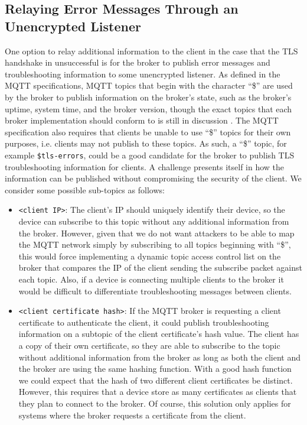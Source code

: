 \documentclass[12pt]{article}
\begin{document}
\subsection{Relaying Error Messages Through an Unencrypted Listener}
One option to relay additional information to the client in the case that the TLS handshake in unsuccessful is for the broker to publish error messages and troubleshooting information to some unencrypted listener. As defined in the MQTT specifications, MQTT topics that begin with the character ``\$'' are used by the broker to publish information on the broker's state, such as the broker's uptime, system time, and the broker version, though the exact topics that each broker implementation should conform to is still in discussion \cite{mqtt-sys}. The MQTT specification also requires that clients be unable to use ``\$'' topics for their own purposes, i.e. clients may not publish to these topics. As such, a ``\$'' topic, for example \texttt{\$tls-errors}, could be a good candidate for the broker to publish TLS troubleshooting information for clients. A challenge presents itself in how the information can be published without compromising the security of the client. We consider some possible sub-topics as follows:
\begin{itemize}
 \item \texttt{<client IP>}: The client's IP should uniquely identify their device, so the device can subscribe to this topic without any additional information from the broker. However, given that we do not want attackers to be able to map the MQTT network simply by subscribing to all topics beginning with ``\$'', this would force implementing a dynamic topic access control list on the broker that compares the IP of the client sending the subscribe packet against each topic. Also, if a device is connecting multiple clients to the broker it would be difficult to differentiate troubleshooting messages between clients.
\item \texttt{<client certificate hash>}: If the MQTT broker is requesting a client certificate to authenticate the client, it could publish troubleshooting information on a subtopic of the client certificate's hash value. The client has a copy of their own certificate, so they are able to subscribe to the topic without additional information from the broker as long as both the client and the broker are using the same hashing function. With a good hash function we could expect that the hash of two different client certificates be distinct. However, this requires that a device store as many certificates as clients that they plan to connect to the broker. Of course, this solution only applies for systems where the broker requests a certificate from the client.
 \end{itemize}
 
\end{document}
